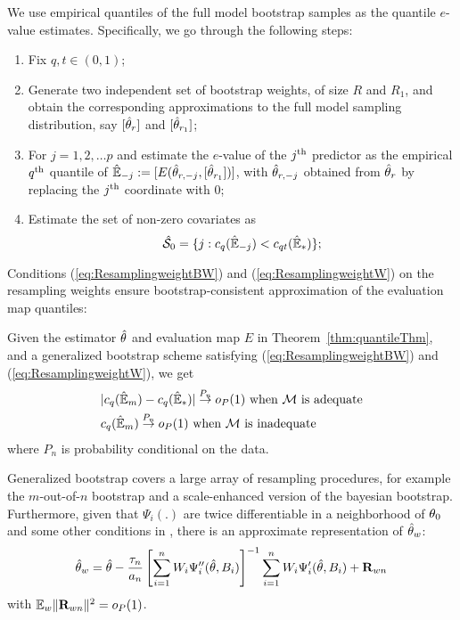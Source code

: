 We use empirical quantiles of the full model bootstrap samples as the quantile $e$-value estimates. Specifically, we go through the following steps:
%
\begin{enumerate}
\item Fix $q,t \in (0,1)$;

\item Generate two independent set of bootstrap weights, of size $R$ and $R_1$, and obtain the corresponding approximations to the full model sampling distribution, say $[ \hat{{\theta}}_{r} ]$ and $[ \hat{{\theta}}_{r_1} ]$;

\item For $j = 1,2,\ldots p$ and estimate the $e$-value of the $j^{\operatorname*{th}}$ predictor as the empirical $q^{\operatorname*{th}}$ quantile of $\hat {\mathbb{E}}_{-j} := [ E( \hat {{\theta}}_{r,-j}, [ \hat {{\theta}}_{r_1}]) ]$, with $\hat {{\theta}}_{r,-j}$ obtained from $\hat {{\theta}}_{r}$ by replacing the $j^{\operatorname*{th}}$ coordinate with 0;

\item Estimate the set of non-zero covariates as
%
$$
\hat {\mathcal{S}}_{0} = \lbrace j: c_q (\hat{\mathbb{E}}_{-j}) <  c_{q t} (\hat{\mathbb{E}}_{*}) \};
$$
\end{enumerate}
%
Conditions (\ref{eq:ResamplingweightBW}) and (\ref{eq:ResamplingweightW}) on the resampling weights ensure bootstrap-consistent approximation of the evaluation map quantiles:
%
%

\begin{Theorem}\label{thm:bootThm}
Given the estimator $\hat {{\theta}}$ and evaluation map $E$ in Theorem~\ref{thm:quantileThm}, and a generalized bootstrap scheme satisfying (\ref{eq:ResamplingweightBW}) and (\ref{eq:ResamplingweightW}), we get
\begin{align}
& | c_{q} ( \hat \BE_{m } ) - c_{q} ( \hat \BE_{* } ) | \stackrel{P_n}{\raro} o_P(1) \text{ when } \cM \text{ is adequate}\label{bootevalEqn2}\\
& c_{q} ( \hat \BE_{m } ) \stackrel{P_n}{\raro} o_P(1) \text{ when } \cM \text{ is inadequate} \label{bootevalEqn3}
\end{align}
%
where $P_n$ is probability conditional on the data.
\end{Theorem}

Generalized bootstrap covers a large array of resampling procedures, for example the $m$-out-of-$n$ bootstrap and a scale-enhanced version of the bayesian bootstrap. %
 Furthermore, given that $\Psi_i(.)$ are twice differentiable in a neighborhood of ${\theta}_0$ and some other conditions in \cite{ChatterjeeBose05}, there is an approximate representation of $\hat {{\theta}}_w$:
%
\begin{align}\label{eqn:BootEqn}
\hat\bftheta_w = \hat\bftheta - \frac{ \tau_n}{a_n} \left[ \sum_{i=1}^n W_i \Psi_i'' (\hat \bftheta, B_i) \right]^{-1}
\sum_{i=1}^n W_i \Psi_i' (\hat \bftheta, B_i) + \bfR_{wn}
\end{align}
%
with $\mathbb{E}_w \| {\mathbf{R}}_{w n} \|^2 = o_P(1)$.

